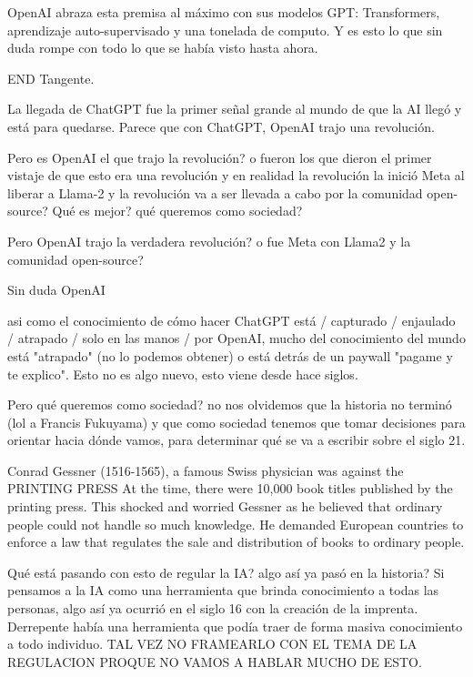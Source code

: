 OpenAI abraza esta premisa al máximo con sus modelos GPT: Transformers, aprendizaje auto-supervisado y una tonelada de computo. Y es esto
lo que sin duda rompe con todo lo que se había visto hasta ahora. 


END Tangente. 


La llegada de ChatGPT fue la primer señal grande al mundo de que la AI llegó y está para quedarse. 
Parece que con ChatGPT, OpenAI trajo una revolución. 

Pero es OpenAI el que trajo la revolución? o fueron los que dieron el primer vistaje de que esto era una revolución y en realidad la revolución
la inició Meta al liberar a Llama-2 y la revolución va a ser llevada a cabo por la comunidad open-source?
Qué es mejor? qué queremos como sociedad?

Pero OpenAI trajo la verdadera revolución? o fue Meta con Llama2 y la comunidad open-source?

Sin duda OpenAI 

asi como el conocimiento de cómo hacer ChatGPT está / capturado / enjaulado / atrapado / solo en las manos / por OpenAI, 
mucho del conocimiento del mundo está "atrapado" (no lo podemos obtener) o está detrás de un paywall "pagame y te explico". 
Esto no es algo nuevo, esto viene desde hace siglos. 




Pero qué queremos como sociedad? no nos olvidemos que la historia no terminó (lol a Francis Fukuyama) y que como sociedad
tenemos que tomar decisiones para orientar hacia dónde vamos, para determinar qué se va a escribir sobre el siglo 21. 

Conrad Gessner (1516-1565), a famous Swiss physician was against the PRINTING PRESS At the time, there were 10,000 book titles published by the printing press.
This shocked and worried Gessner as he believed that ordinary people could not handle so much knowledge. 
He demanded European countries to enforce a law that regulates the sale and distribution of books to ordinary people. 


Qué está pasando con esto de regular la IA? algo así ya pasó en la historia?
Si pensamos a la IA como una herramienta que brinda conocimiento a todas las personas, algo así ya ocurrió en el siglo 16 con la 
creación de la imprenta. Derrepente había una herramienta que podía traer de forma masiva conocimiento a todo individuo. 
TAL VEZ NO FRAMEARLO CON EL TEMA DE LA REGULACION PROQUE NO VAMOS A HABLAR MUCHO DE ESTO. 

